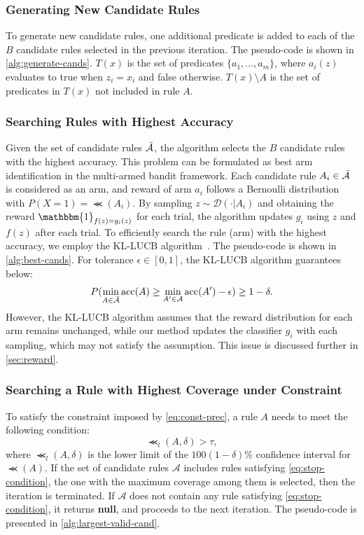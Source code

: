 \documentclass[runningheads]{llncs}
\begin{document}
\subsubsection{Generating New Candidate Rules}
To generate new candidate rules,
one additional predicate is added to each of the $B$ candidate rules
selected in the previous iteration.
The pseudo-code is shown in \cref{alg:generate-cands}.
$T(x)$ is the set of predicates $\{a_1,\dots,a_m\}$,
where $a_i(z)$ evaluates to true when $z_i=x_i$ and false otherwise.
$T(x)\setminus A$ is the set of predicates in $T(x)$ not included in rule $A$.

\subsubsection{Searching Rules with Highest Accuracy}
Given the set of candidate rules $\bar{\mathcal{A}}$,
the algorithm selects the $B$ candidate rules with the highest accuracy.
This problem can be formulated
as best arm identification in the multi-armed bandit framework.
Each candidate rule $A_i\in\bar{\mathcal{A}}$ is considered as an arm,
and reward of arm $a_i$ follows a Bernoulli distribution
with $P(X=1)=\Prec(A_i)$.
By sampling $z\sim\mathcal{D}(\cdot|A_i)$
and obtaining the reward $\mathbbm{1}_{f(z)=g_i(z)}$ for each trial,
the algorithm updates $g_i$ using $z$ and $f(z)$ after each trial.
To efficiently search the rule (arm) with the highest accuracy,
we employ the KL-LUCB algorithm~\cite{kaufmann2013information}.
The pseudo-code is shown in \cref{alg:best-cands}.
For tolerance $\epsilon\in[0,1]$, the KL-LUCB algorithm guarantees below:
\begin{equation}
  P(\underset{A\in\bar{\mathcal{A}}}{\min}\operatorname{acc}(A)\ge
  \underset{A'\in\mathcal{A}}{\min}\operatorname{acc}(A')-\epsilon)\ge1-\delta.
\end{equation}
However,
the KL-LUCB algorithm assumes that the reward distribution for each arm
remains unchanged,
while our method updates the classifier $g_i$ with each sampling,
which may not satisfy the assumption.
This issue is discussed further in \cref{sec:reward}.

\subsubsection{Searching a Rule with Highest Coverage under Constraint}
To satisfy the constraint imposed by \cref{eq:const-prec},
a rule $A$ needs to meet the following condition:
\begin{equation}
  \Prec_{l}(A,\delta)>\tau,\label{eq:stop-condition}
\end{equation}
where $\Prec_{l}(A,\delta)$ is the lower limit of
the $100(1-\delta)$\% confidence interval for $\Prec(A)$.
If the set of candidate rules $\mathcal{A}$
includes rules satisfying \cref{eq:stop-condition},
the one with the maximum coverage among them is selected,
then the iteration is terminated.
If $\mathcal{A}$ does not contain any rule satisfying \cref{eq:stop-condition},
it returns \textbf{null},
and proceeds to the next iteration.
The pseudo-code is presented in \cref{alg:largest-valid-cand}.
\end{document}
